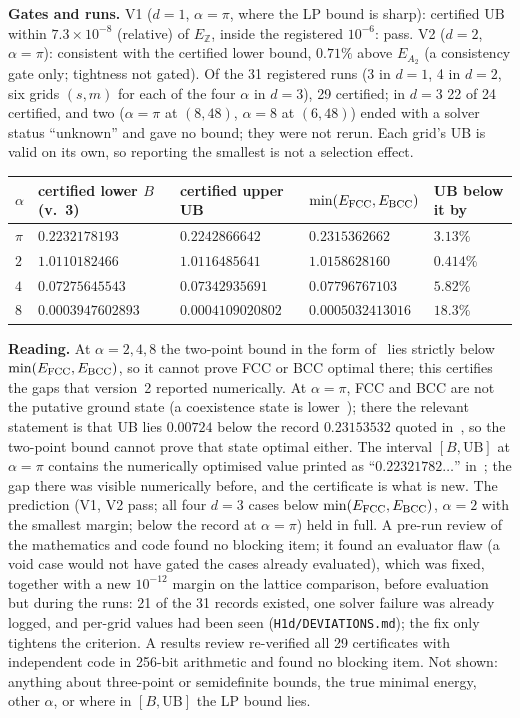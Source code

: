 \textbf{Gates and runs.} V1 ($d=1$, $\alpha=\pi$, where the LP bound is sharp): certified $\mathrm{UB}$ within $7.3\times10^{-8}$
(relative) of $E_{\mathbb Z}$, inside the registered $10^{-6}$: pass. V2 ($d=2$, $\alpha=\pi$): consistent with the certified
lower bound, $0.71\%$ above $E_{A_2}$ (a consistency gate only; tightness not gated). Of the 31 registered runs (3 in $d=1$,
4 in $d=2$, six grids $(s,m)$ for each of the four $\alpha$ in $d=3$), 29 certified; in $d=3$ 22 of 24 certified, and two ($\alpha=\pi$ at $(8,48)$, $\alpha=8$ at $(6,48)$) ended with a solver status ``unknown'' and gave no bound;
they were not rerun. Each grid's UB is valid on its own, so reporting the smallest is not a selection effect.
\begin{center}\small
\begin{tabular}{lllll}\toprule
$\alpha$ & certified lower $B$ (v.~3) & certified upper UB & $\min(E_{\rm FCC},E_{\rm BCC})$ & UB below it by\\\midrule
$\pi$ & $0.2232178193$ & $0.2242866642$ & $0.2315362662$ & $3.13\%$\\
$2$ & $1.0110182466$ & $1.0116485641$ & $1.0158628160$ & $0.414\%$\\
$4$ & $0.07275645543$ & $0.07342935691$ & $0.07796767103$ & $5.82\%$\\
$8$ & $0.0003947602893$ & $0.0004109020802$ & $0.0005032413016$ & $18.3\%$\\\bottomrule
\end{tabular}
\end{center}
\textbf{Reading.} At $\alpha=2,4,8$ the two-point bound in the form of~\cite[Prop.~2.2]{CdCI16} lies strictly below
$\min(E_{\rm FCC},E_{\rm BCC})$, so it cannot prove FCC or BCC optimal there; this certifies the gaps that version~2 reported
numerically. At $\alpha=\pi$, FCC and BCC are not the putative ground state (a coexistence state is lower~\cite{CKS09}); there the
relevant statement is that UB lies $0.00724$ below the record $0.23153532$ quoted in~\cite{CdCI16}, so the two-point bound cannot
prove that state optimal either. The interval $[B,\mathrm{UB}]$ at $\alpha=\pi$ contains the numerically optimised value
printed as ``$0.22321782\ldots$'' in~\cite{CdCI16}; the gap there was visible numerically before, and the certificate is what is new. The prediction
(V1, V2 pass; all four $d=3$ cases below $\min(E_{\rm FCC},E_{\rm BCC})$, $\alpha=2$ with the smallest margin; below the record at
$\alpha=\pi$) held in full. A pre-run review of the mathematics and code found no blocking item; it found an evaluator flaw
(a void case would not have gated the cases already evaluated), which was fixed, together with a new $10^{-12}$ margin on the
lattice comparison, before evaluation but during the runs: 21 of the 31 records existed, one solver failure was already logged,
and per-grid values had been seen (\texttt{H1d/DEVIATIONS.md}); the fix only tightens the criterion. A results review re-verified all 29 certificates
with independent code in 256-bit arithmetic and found no blocking item. Not shown: anything about three-point or semidefinite bounds, the true minimal
energy, other $\alpha$, or where in $[B,\mathrm{UB}]$ the LP bound lies.

